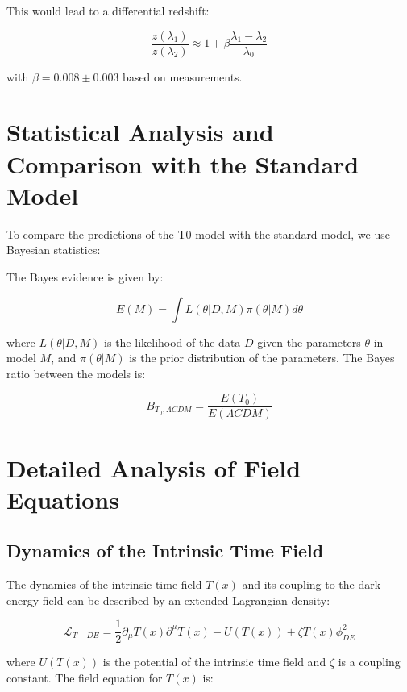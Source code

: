 \documentclass[a4paper,12pt]{article}
\theoremstyle{definition}
\theoremstyle{remark}
\newcommand{\Tfield}{T(x)} %
\begin{document}
	This would lead to a differential redshift:
	
	\begin{equation}
		\frac{z(\lambda_1)}{z(\lambda_2)} \approx 1 + \beta\frac{\lambda_1 - \lambda_2}{\lambda_0}
	\end{equation}
	
	with \(\beta = 0.008 \pm 0.003\) based on measurements.
	
	\section{Statistical Analysis and Comparison with the Standard Model}
	
	To compare the predictions of the T0-model with the standard model, we use Bayesian statistics:
	
	The Bayes evidence is given by:
	
	\begin{equation}
		E(M) = \int L(\theta|D,M) \pi(\theta|M) d\theta
	\end{equation}
	
	where \(L(\theta|D,M)\) is the likelihood of the data \(D\) given the parameters \(\theta\) in model \(M\), and \(\pi(\theta|M)\) is the prior distribution of the parameters. The Bayes ratio between the models is:
	
	\begin{equation}
		B_{T_0,\Lambda CDM} = \frac{E(T_0)}{E(\Lambda CDM)}
	\end{equation}
	
	\section{Detailed Analysis of Field Equations}
	
	\subsection{Dynamics of the Intrinsic Time Field}
	
	The dynamics of the intrinsic time field \(\Tfield\) and its coupling to the dark energy field can be described by an extended Lagrangian density:
	
	\begin{equation}
		\mathcal{L}_{T-DE} = \frac{1}{2}\partial_\mu \Tfield \partial^\mu \Tfield - U(\Tfield) + \zeta \Tfield \phi_{DE}^2
	\end{equation}
	
	where \(U(\Tfield)\) is the potential of the intrinsic time field and \(\zeta\) is a coupling constant. The field equation for \(\Tfield\) is:
	
\end{document}

